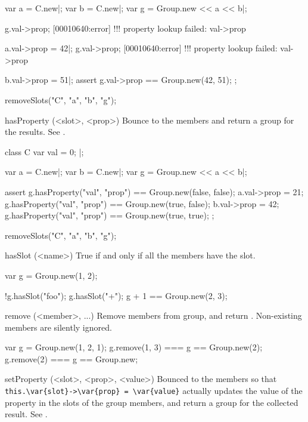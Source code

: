 \begin{urbiscriptapi}
\begin{urbiscript}
var a = C.new|; var b = C.new|;
var g = Group.new << a << b|;

g.val->prop;
[00010640:error] !!! property lookup failed: val->prop

a.val->prop = 42|;
g.val->prop;
[00010640:error] !!! property lookup failed: val->prop

b.val->prop = 51|;
assert
{
  g.val->prop == Group.new(42, 51);
};
\end{urbiscript}
\begin{urbicomment}
  removeSlots("C", "a", "b", "g");
\end{urbicomment}


\item[hasProperty](<slot>, <prop>)%
  Bounce to the members and return a group for the results.  See
  .
\begin{urbiscript}
class C
{
  var val = 0;
}|;

var a = C.new|; var b = C.new|;
var g = Group.new << a << b|;

assert
{
  g.hasProperty("val", "prop") == Group.new(false, false);
  a.val->prop = 21;
  g.hasProperty("val", "prop") == Group.new(true, false);
  b.val->prop = 42;
  g.hasProperty("val", "prop") == Group.new(true, true);
};
\end{urbiscript}
\begin{urbicomment}
  removeSlots("C", "a", "b", "g");
\end{urbicomment}



\item[hasSlot](<name>)%
  True if and only if all the members have the slot.

\begin{urbiassert}
var g = Group.new(1, 2);

!g.hasSlot("foo");
 g.hasSlot("+");
 g + 1 == Group.new(2, 3);
\end{urbiassert}


\item[remove](<member>, ...)%
  Remove members from \this group, and return \this.  Non-existing members
  are silently ignored.
\begin{urbiassert}
var g = Group.new(1, 2, 1);
g.remove(1, 3) === g == Group.new(2);
g.remove(2)    === g == Group.new;
\end{urbiassert}


\item[setProperty](<slot>, <prop>, <value>)%
  Bounced to the members so that
  \lstinline|this.\var{slot}->\var{prop} = \var{value}| actually updates the
  value of the property  in the slots  of the group
  members, and return a group for the collected result.  See
  .


\end{urbiscriptapi}
